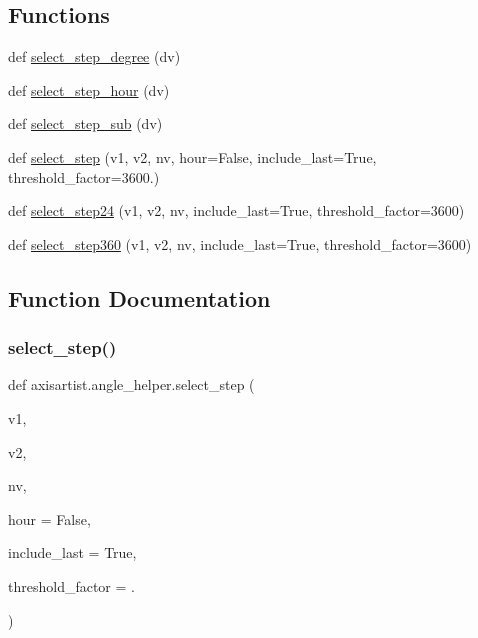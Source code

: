 \subsection*{Functions}
\begin{DoxyCompactItemize}
\item 
def \hyperlink{namespaceaxisartist_1_1angle__helper_a56ad0500f165ce90084124e09ad4a8f8}{select\+\_\+step\+\_\+degree} (dv)
\item 
def \hyperlink{namespaceaxisartist_1_1angle__helper_a351625a8cd6398cd007c17fec571c263}{select\+\_\+step\+\_\+hour} (dv)
\item 
def \hyperlink{namespaceaxisartist_1_1angle__helper_a2ce7af5cbc923f2c9d87b45e7cf0e628}{select\+\_\+step\+\_\+sub} (dv)
\item 
def \hyperlink{namespaceaxisartist_1_1angle__helper_a6a02a6d3cbe013666f6e8b767dc69e3d}{select\+\_\+step} (v1, v2, nv, hour=False, include\+\_\+last=True, threshold\+\_\+factor=3600.)
\item 
def \hyperlink{namespaceaxisartist_1_1angle__helper_a78ed0f85dce52260488b8e01ab3a6faf}{select\+\_\+step24} (v1, v2, nv, include\+\_\+last=True, threshold\+\_\+factor=3600)
\item 
def \hyperlink{namespaceaxisartist_1_1angle__helper_a14be9157114337d6aa01fda879ae6fcd}{select\+\_\+step360} (v1, v2, nv, include\+\_\+last=True, threshold\+\_\+factor=3600)
\end{DoxyCompactItemize}


\subsection{Function Documentation}
\mbox{\label{namespaceaxisartist_1_1angle__helper_a6a02a6d3cbe013666f6e8b767dc69e3d}} 
\subsubsection{\texorpdfstring{select\+\_\+step()}{select\_step()}}
{\footnotesize\ttfamily def axisartist.\+angle\+\_\+helper.\+select\+\_\+step (\begin{DoxyParamCaption}\item[{}]{v1,  }\item[{}]{v2,  }\item[{}]{nv,  }\item[{}]{hour = {\ttfamily False},  }\item[{}]{include\+\_\+last = {\ttfamily True},  }\item[{}]{threshold\+\_\+factor = {.} }\end{DoxyParamCaption})}

